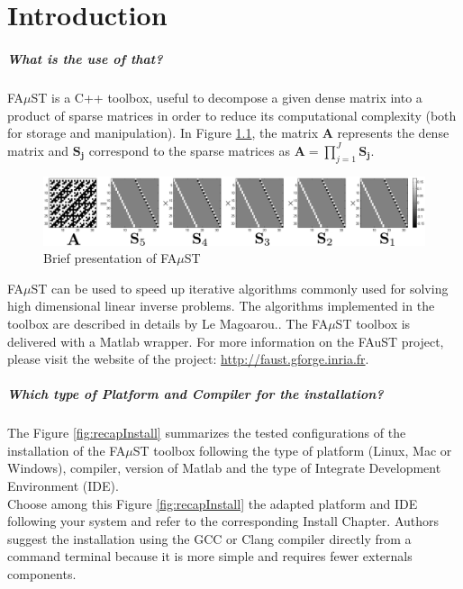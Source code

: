 \chapter{Introduction}\label{sec:intro}

\paragraph{What is the use of that?}FA$\mu$ST is a C++ toolbox, useful to decompose a given dense matrix into a product of sparse matrices in order to reduce its computational complexity (both for storage and manipulation). In Figure \ref{fig:presentation}, the matrix \textbf{A} represents the dense matrix and $\mathbf{S_j}$ correspond to the sparse matrices as $\mathbf{A}=\prod_{j=1}^J\mathbf{S_j}$.

\begin{figure}[H] %
\centering
\includegraphics[scale=0.5]{images/hadamard32_bw.pdf}
\caption{Brief presentation of FA$\mu$ST}
\label{fig:presentation}
\end{figure}

FA$\mu$ST can be used to speed up iterative algorithms commonly used for solving high dimensional linear inverse problems. The algorithms implemented in the toolbox are described in details by Le Magoarou.\cite{LeMagoarou2016}.
The FA$\mu$ST toolbox is delivered with a Matlab wrapper. 
For more information on the FAuST project, please visit the website of the project: \url{http://faust.gforge.inria.fr}.


\paragraph{Which type of Platform and Compiler for the installation?} 
The Figure \ref{fig:recapInstall} summarizes the tested configurations of the installation of the FA$\mu$ST toolbox following the type of platform (Linux, Mac or Windows), compiler, version of Matlab and the type of Integrate Development Environment (IDE).\\
Choose among this Figure \ref{fig:recapInstall} the adapted platform and IDE following your system and refer to the corresponding Install Chapter. Authors suggest the installation using the GCC or Clang compiler directly from a command terminal because it is more simple and requires fewer externals components. 

